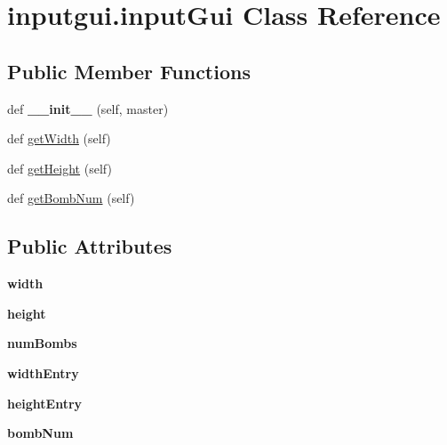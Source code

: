 \hypertarget{classinputgui_1_1input_gui}{}\section{inputgui.\+input\+Gui Class Reference}
\label{classinputgui_1_1input_gui}
\subsection*{Public Member Functions}
\begin{DoxyCompactItemize}
\item 
\mbox{\label{classinputgui_1_1input_gui_af9af6444741570b26c7f419d11c6e823}} 
def {\bfseries \+\_\+\+\_\+init\+\_\+\+\_\+} (self, master)
\item 
def \mbox{\hyperlink{classinputgui_1_1input_gui_acb2f03dc243b615d56b85025e72fe83d}{get\+Width}} (self)
\item 
def \mbox{\hyperlink{classinputgui_1_1input_gui_a0f58dcdd5da2004e96ce2e846aa8d70b}{get\+Height}} (self)
\item 
def \mbox{\hyperlink{classinputgui_1_1input_gui_ad092a378c7af02c7bef4055297ad10d0}{get\+Bomb\+Num}} (self)
\end{DoxyCompactItemize}
\subsection*{Public Attributes}
\begin{DoxyCompactItemize}
\item 
\mbox{\label{classinputgui_1_1input_gui_a111f8e332432a90ad5afc1cf9c28c2e8}} 
{\bfseries width}
\item 
\mbox{\label{classinputgui_1_1input_gui_a63df299e701f8ca402988495b384368f}} 
{\bfseries height}
\item 
\mbox{\label{classinputgui_1_1input_gui_a62e0a13711c70a8850c47265683eb048}} 
{\bfseries num\+Bombs}
\item 
\mbox{\label{classinputgui_1_1input_gui_abeb3916d0c4ec6540cf540cd276f4269}} 
{\bfseries width\+Entry}
\item 
\mbox{\label{classinputgui_1_1input_gui_a191a2aeabc5247c3b214de35c0eabce0}} 
{\bfseries height\+Entry}
\item 
\mbox{\label{classinputgui_1_1input_gui_adcdf2fa640444a279c20d0e44a1c0d99}} 
{\bfseries bomb\+Num}
\end{DoxyCompactItemize}


